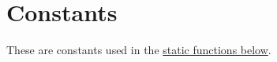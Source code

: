 \hypertarget{group___constants}{}\section{Constants}
\label{group___constants}
These are constants used in the \hyperlink{}{static functions below}. 